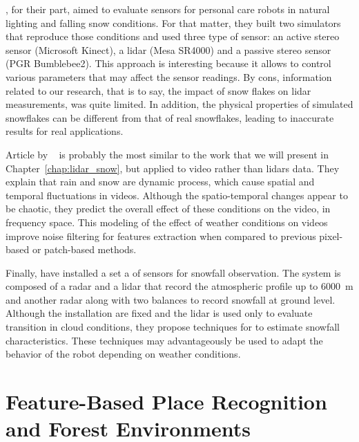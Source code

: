 \citet{sumi-arso-13}, for their part, aimed to evaluate sensors for personal care robots in natural lighting and falling snow conditions. For that matter, they built two simulators that reproduce those conditions and used three type of sensor: an active stereo sensor (Microsoft Kinect), a \gls*{lidar} (Mesa SR4000) and a passive stereo sensor (PGR Bumblebee2). This approach is interesting because it allows to control various parameters that may affect the sensor readings. By cons, information related to our research, that is to say, the impact of snow flakes on \gls*{lidar} measurements, was quite limited. In addition, the physical properties of simulated snowflakes can be different from that of real snowflakes, leading to inaccurate results for real applications.

Article by ~\citet{barnum2010analysis} is probably the most similar to the work that we will present in Chapter~\ref{chap:lidar_snow}, but applied to video rather than \gls*{lidar}s data. They explain that rain and snow are dynamic process, which cause spatial and temporal fluctuations in videos. Although the spatio-temporal changes appear to be chaotic, they predict the overall effect of these conditions on the video, in frequency space. This modeling of the effect of weather conditions on videos improve noise filtering for features extraction when compared to previous pixel-based or patch-based methods.

Finally, \citet{servomaa2002snowfall} have installed a set a of sensors for snowfall observation. The system is composed of a radar and a \gls*{lidar} that record the atmospheric profile up to \SI{6000}{\meter} and another radar along with two balances to record snowfall at ground level. Although the installation are fixed and the \gls*{lidar} is used only to evaluate transition in cloud conditions, they propose techniques for to estimate snowfall characteristics. These techniques may advantageously be used to adapt the behavior of the robot depending on weather conditions.  



\section{Feature-Based Place Recognition and Forest Environments}
\label{sec:literature_slam}

